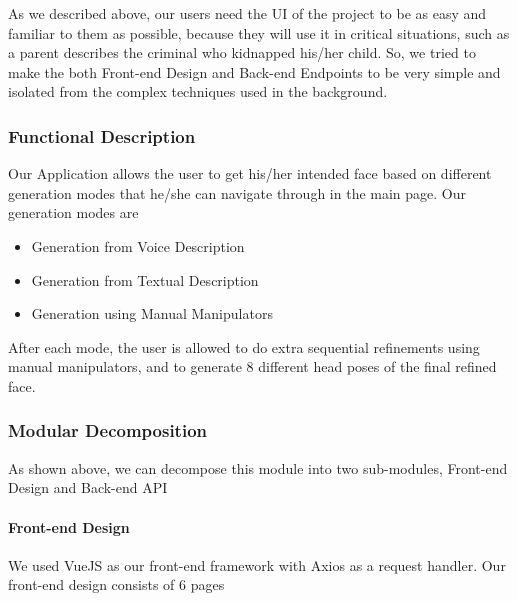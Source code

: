 As we described above, our users need the UI of the project to be as easy and familiar to them as possible, because they will use it in critical situations, such as a parent describes the criminal who kidnapped his/her child. So, we tried to make the both Front-end Design and Back-end Endpoints to be very simple and isolated from the complex techniques used in the background.

\subsubsection{Functional Description}

Our Application allows the user to get his/her intended face based on different generation modes that he/she can navigate through in the main page. Our generation modes are
\begin{itemize}
    \item Generation from Voice Description
    \item Generation from Textual Description
    \item Generation using Manual Manipulators
\end{itemize}
After each mode, the user is allowed to do extra sequential refinements using manual manipulators, and to generate 8 different head poses of the final refined face.


\subsubsection{Modular Decomposition}
As shown above, we can decompose this module into two sub-modules, Front-end Design and Back-end API

\paragraph{Front-end Design}
We used VueJS as our front-end framework with Axios as a request handler. Our front-end design consists of 6 pages

